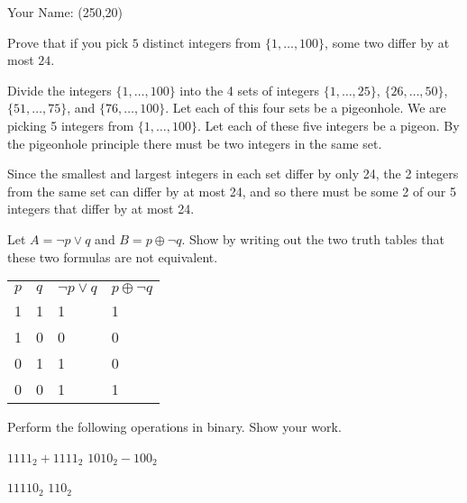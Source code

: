 \documentclass[solution, letterpaper]{cs20exam}
\newcommand{\namebox}{\framebox(250,20){}}
\begin{document}

\vspace{-1.8in}\hbox{}\hspace{2in}Your Name: \namebox
\vspace{1.2in}

\problem{}{} Prove that if you pick $5$ distinct integers from $\{1, \ldots, 100\}$, some two differ by at most $24$.

\begin{solution}
Divide the integers $\{1, \ldots, 100\}$ into the 4 sets of integers $\{1, \ldots, 25\}$, $\{26, \ldots, 50\}$, $\{51, \ldots, 75\}$, and $\{76, \ldots, 100\}$. Let each of this four sets be a pigeonhole. We are picking 5 integers from $\{1, \ldots, 100\}$. Let each of these five integers be a pigeon. By the pigeonhole principle there must be two integers in the same set.  

Since the smallest and largest integers in each set differ by only 24, the 2 integers from the same set can differ by at most 24, and so there must be some 2 of our 5 integers that differ by at most 24.
\end{solution}

\pagebreak

\problem{}{} Let $A = \neg p \lor q$ and $B = p \oplus \neg q$. Show by writing out the two truth tables that these two formulas are not equivalent.

\begin{solution}
\begin{table}[h]
\centering
\label{my-label}
\begin{tabular}{llll}
$p$ & $q$ & $\neg p \lor q$ & $p \oplus \neg q$ \\
1   & 1   & 1               & 1                 \\
1   & 0   & 0               & 0                 \\
0   & 1   & 1               & 0                 \\
0   & 0   & 1               & 1                
\end{tabular}
\end{table}
\end{solution}

\pagebreak

\problem{}{} Perform the following operations in binary. Show your work.

\subproblem $1111_2 + 1111_2$
\subproblem $1010_2 - 100_2$

\begin{solution}
\subsolution $11110_2$
\subsolution $110_2$
\end{solution}
\end{document}
